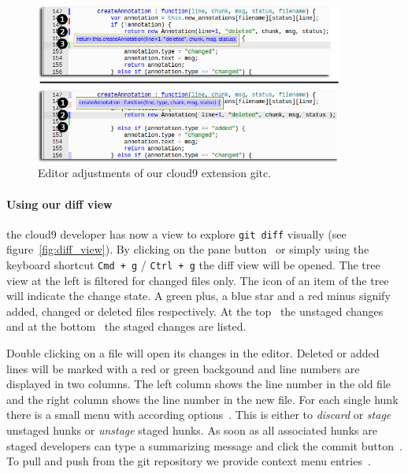 \begin{figure}
   \centering
   \includegraphics[width=0.9\textwidth]{images/extension_tooltip_comparison.png}
   \caption{Editor adjustments of our cloud9 extension gitc.}
   \label{fig:editor}
\end{figure}

\paragraph{Using our diff view} the cloud9 developer has now a view to explore \texttt{git diff} visually (see figure~\ref{fig:diff_view}).
By clicking on the pane button~ or simply using the keyboard shortcut  \texttt{Cmd + g} / \texttt{Ctrl + g} the diff view will be opened.
The tree view at the left is filtered for changed files only.
The icon of an item of the tree will indicate the change state.
A green plus, a blue star and a red minus signify added, changed or deleted files respectively.
At the top~ the unstaged changes and at the bottom~ the staged changes are listed.

Double clicking on a file will open its changes in the editor.
Deleted or added lines will be marked with a red or green backgound and line numbers are displayed in two columns.
The left column shows the line number in the old file and the right column shows the line number in the new file.
For each single hunk there is a small menu with according options~.
This is either to \emph{discard} or \emph{stage} unstaged hunks or \emph{unstage} staged hunks.
As soon as all associated hunks are staged developers can type a summarizing message and click the commit button~.
To pull and push from the git repository we provide context menu entries~.

